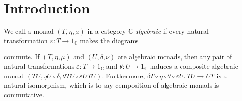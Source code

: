 \section{Introduction}

We call a monad \(\left(T, \eta, \mu\right)\) in a category \(\mathbb{C}\) \emph{algebraic} if every natural transformation \(\varepsilon : T \rightarrow 1_\mathbb{C}\) makes the diagrams

\medskip
\noindent\begin{minipage}{\dimexpr.5\textwidth-.5\columnsep}
  \centering
\end{minipage}\begin{minipage}{\dimexpr.5\textwidth-.5\columnsep}
  \centering
\end{minipage}
\medskip

\noindent commute. If \(\left(T, \eta, \mu\right)\) and \(\left(U, \delta, \nu\right)\) are algebraic monads, then any pair of natural transformations \(\varepsilon : T \rightarrow 1_\mathbb{C}\) and \(\theta : U \rightarrow 1_\mathbb{C}\) induces a composite algebraic monad \(\left(T U, \eta U \circ \delta, \theta TU \circ \varepsilon UTU\right)\). Furthermore, \(\delta T \circ \eta \circ \theta \circ \varepsilon U : TU \rightarrow UT\) is a natural isomorphism, which is to say composition of algebraic monads is commutative.
